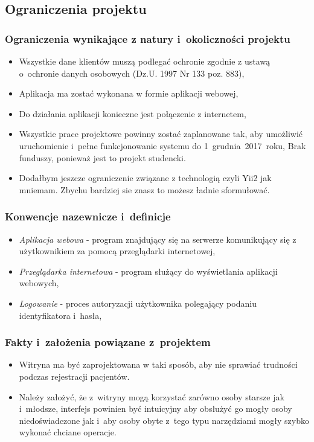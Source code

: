 \subsection{Ograniczenia projektu}

\subsubsection{Ograniczenia wynikające z natury i~okoliczności projektu}

\begin{itemize}
	\item Wszystkie dane klientów muszą podlegać ochronie zgodnie z ustawą o~ochronie danych osobowych (Dz.U. 1997 Nr 133 poz. 883),
	\item Aplikacja ma zostać wykonana w formie aplikacji webowej,
	\item Do działania aplikacji konieczne jest połączenie z internetem,
	\item Wszystkie prace projektowe powinny zostać zaplanowane tak, aby umożliwić uruchomienie i~pełne funkcjonowanie systemu do 1~grudnia~2017~roku,
Brak funduszy, ponieważ jest to projekt studencki.
	\item Dodałbym jeszcze ograniczenie związane z technologią czyli Yii2 jak mniemam. Zbychu bardziej sie znasz to możesz ładnie sformułować.
\end{itemize}

\subsubsection{Konwencje nazewnicze i~definicje}
\begin{itemize}
	\item \textit{Aplikacja webowa} - program znajdujący się na serwerze komunikujący się z użytkownikiem za pomocą przeglądarki internetowej,
	\item \textit{Przeglądarka internetowa} - program służący do wyświetlania aplikacji webowych,
	\item \textit{Logowanie} - proces autoryzacji użytkownika polegający podaniu identyfikatora i~hasła,
\end{itemize}

\subsubsection{Fakty i~założenia powiązane z~projektem}
\begin{itemize}
	\item Witryna ma być zaprojektowana w taki sposób, aby nie sprawiać trudności podczas rejestracji pacjentów.
	\item Należy założyć, że z~witryny mogą korzystać zarówno osoby starsze jak i~młodsze, interfejs powinien być intuicyjny aby obsłużyć go mogły osoby niedoświadczone jak i~aby osoby obyte z~tego typu narzędziami mogły szybko wykonać chciane operacje. %
\end{itemize}

